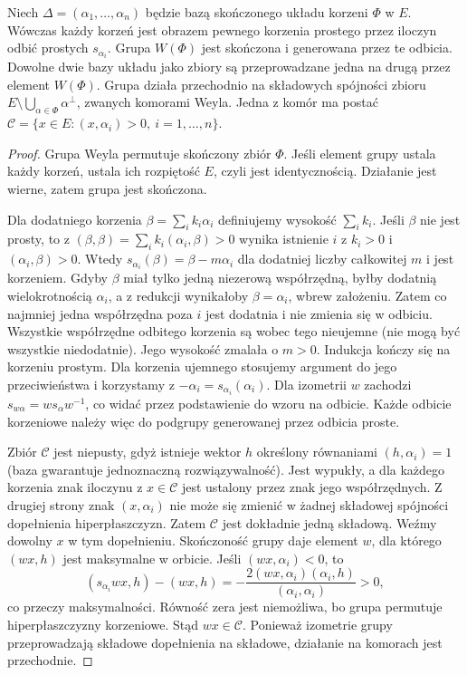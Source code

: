 \begin{twierdzenie}
\label{aa:tw:weyl-chambers}
Niech $\Delta=(\alpha_1,\ldots,\alpha_n)$ będzie
bazą skończonego układu korzeni $\Phi$ w $E$.
Wówczas każdy korzeń jest obrazem pewnego korzenia
prostego przez iloczyn odbić prostych $s_{\alpha_i}$.
Grupa $W(\Phi)$ jest skończona i generowana przez te
odbicia. Dowolne dwie bazy układu jako zbiory są
przeprowadzane jedna na drugą przez element $W(\Phi)$.
Grupa działa przechodnio na składowych spójności
zbioru $E\setminus\bigcup_{\alpha\in\Phi}\alpha^\perp$,
zwanych komorami Weyla. Jedna z komór ma postać
$\mathcal C=\{x\in E:(x,\alpha_i)>0,\ i=1,\ldots,n\}$.
\end{twierdzenie}
\begin{proof}
Grupa Weyla permutuje skończony zbiór $\Phi$.
Jeśli element grupy ustala każdy korzeń, ustala ich
rozpiętość $E$, czyli jest identycznością. Działanie
jest wierne, zatem grupa jest skończona.

Dla dodatniego korzenia $\beta=\sum_i k_i\alpha_i$
definiujemy wysokość $\sum_i k_i$. Jeśli $\beta$
nie jest prosty, to z
$(\beta,\beta)=\sum_i k_i(\alpha_i,\beta)>0$
wynika istnienie $i$ z $k_i>0$ i
$(\alpha_i,\beta)>0$. Wtedy
$s_{\alpha_i}(\beta)=\beta-m\alpha_i$ dla dodatniej
liczby całkowitej $m$ i jest korzeniem.
Gdyby $\beta$ miał tylko jedną niezerową współrzędną,
byłby dodatnią wielokrotnością $\alpha_i$, a z redukcji
wynikałoby $\beta=\alpha_i$, wbrew założeniu.
Zatem co najmniej jedna współrzędna poza $i$
jest dodatnia i nie zmienia się w odbiciu.
Wszystkie współrzędne odbitego korzenia są wobec tego
nieujemne (nie mogą być wszystkie niedodatnie).
Jego wysokość zmalała o $m>0$.
Indukcja kończy się na korzeniu prostym.
Dla korzenia ujemnego stosujemy argument do jego
przeciwieństwa i korzystamy z $-\alpha_i=s_{\alpha_i}(\alpha_i)$.
Dla izometrii $w$ zachodzi $s_{w\alpha}=ws_\alpha w^{-1}$,
co widać przez podstawienie do wzoru na odbicie.
Każde odbicie korzeniowe należy więc do podgrupy
generowanej przez odbicia proste.

Zbiór $\mathcal C$ jest niepusty, gdyż istnieje
wektor $h$ określony równaniami $(h,\alpha_i)=1$
(baza gwarantuje jednoznaczną rozwiązywalność).
Jest wypukły, a dla każdego korzenia znak iloczynu
z $x\in\mathcal C$ jest ustalony przez znak jego
współrzędnych. Z drugiej strony znak $(x,\alpha_i)$
nie może się zmienić w żadnej składowej spójności
dopełnienia hiperpłaszczyzn. Zatem $\mathcal C$
jest dokładnie jedną składową.
Weźmy dowolny $x$ w tym dopełnieniu. Skończoność grupy
daje element $w$, dla którego $(wx,h)$ jest maksymalne
w orbicie. Jeśli $(wx,\alpha_i)<0$, to
\[
 (s_{\alpha_i}wx,h)-(wx,h)
 =-\frac{2(wx,\alpha_i)(\alpha_i,h)}{(\alpha_i,\alpha_i)}>0,
\]
co przeczy maksymalności. Równość zera jest niemożliwa,
bo grupa permutuje hiperpłaszczyzny korzeniowe.
Stąd $wx\in\mathcal C$. Ponieważ izometrie grupy
przeprowadzają składowe dopełnienia na składowe,
działanie na komorach jest przechodnie.


\end{proof}
